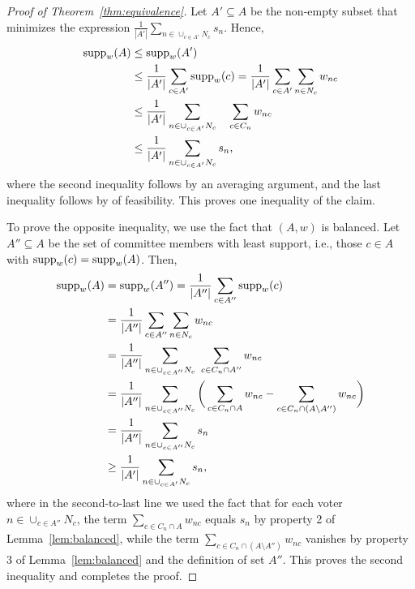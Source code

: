 \begin{proof}[Proof of Theorem~\ref{thm:equivalence}]
Let $A'\subseteq A$ be the non-empty subset that minimizes the expression $\frac{1}{|A'|} \sum_{n\in \cup_{c\in A'} N_c} s_n$. Hence, 
\begin{align*}
    \operatorname{supp}_w(A) &\leq \operatorname{supp}_w(A') \\
		& \leq \frac{1}{|A'|} \sum_{c\in A'} \operatorname{supp}_w(c) = \frac{1}{|A'|} \sum_{c\in A'} \sum_{n\in N_c} w_{nc} \\ 
    & \leq \frac{1}{|A'|}  \sum_{n\in \cup_{c\in A'} N_c} \quad \sum_{c\in C_n} w_{nc} \\
    & \leq \frac{1}{|A'|} \sum_{n\in \cup_{c\in A'} N_c} s_n,
\end{align*}
%
where the second inequality follows by an averaging argument, and the last inequality follows by of feasibility. 
This proves one inequality of the claim. 

To prove the opposite inequality, we use the fact that $(A,w)$ is balanced. 
Let $A''\subseteq A$ be the set of committee members with least support, i.e., those $c\in A$ with $\operatorname{supp}_w(c)=\operatorname{supp}_w(A)$. Then,
\begin{align*}
    \operatorname{supp}_w(A) &= \operatorname{supp}_w(A'') = \frac{1}{|A''|} \sum_{c\in A''} \operatorname{supp}_w(c) \\
		& = \frac{1}{|A''|} \sum_{c\in A''} \sum_{n\in N_c} w_{nc} \\
    &= \frac{1}{|A''|} \sum_{n\in \cup_{c\in A''} N_c} \ \sum_{c\in C_n\cap A''} w_{nc} \\
    &= \frac{1}{|A''|} \sum_{n\in \cup_{c\in A''} N_c} \bigg( \sum_{c\in C_n\cap A} w_{nc} 
		- \sum_{c\in C_n \cap (A\setminus A'')} w_{nc}\bigg)\\
		&= \frac{1}{|A''|}\sum_{n\in \cup_{c\in A''} N_c} s_n \\
		&\geq \frac{1}{|A'|}\sum_{n\in \cup_{c\in A'}N_c} s_n,
\end{align*}
%
where in the second-to-last line we used the fact that for each voter $n\in \cup_{c\in A''} N_c$, the term $\sum_{c\in C_n\cap A} w_{nc}$ equals $s_n$ by property 2 of Lemma~\ref{lem:balanced}, while the term $\sum_{c\in C_n \cap (A\setminus A'')} w_{nc}$ vanishes by property 3 of Lemma~\ref{lem:balanced} and the definition of set $A''$. 
This proves the second inequality and completes the proof.
\end{proof}


